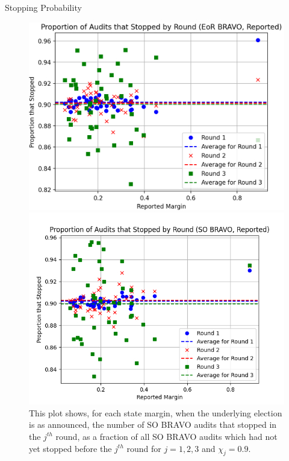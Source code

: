 \documentclass[final]{beamer}
\newcommand{\BRAVO}{\textsc{BRAVO}\xspace}
\newlength{\colwidth}
\begin{document}
\begin{frame}[t]
\begin{columns}[t]
\begin{column}{\colwidth}
\begin{block}{Stopping Probability}
\begin{figure}[h]
\begin{minipage}{.49\textwidth}
\begin{centering}
\includegraphics[width=1.0\textwidth]{eor_bravo_90perc_10^4_corrected/sprob_first_three_cropped.png}\caption{
This plot shows, for each state margin, when the underlying election is as announced, the number of EoR \BRAVO audits that stopped in the $j^{th}$ round,
as a fraction of all EoR \BRAVO audits which had not yet stopped before the $j^{th}$ round for $j=1,2,3$ and $\chi_j=0.9$.}
\label{fig:eor_bravo_sprob}
\end{centering}\end{minipage}
\begin{minipage}{.49\textwidth}
\begin{centering}
\includegraphics[width=1.0\textwidth]{so_bravo_90perc_10^4/sprob_first_three.png}\caption{
This plot shows, for each state margin, when the underlying election is as announced, the number of SO \BRAVO audits that stopped in the $j^{th}$ round,
as a fraction of all SO \BRAVO audits which had not yet stopped before the $j^{th}$ round for $j=1,2,3$ and $\chi_j=0.9$.}
\label{fig:so_bravo_sprob}
\end{centering}
\end{minipage}


\end{figure}
\end{block}
\end{column}
\end{columns}
\end{frame}
\end{document}

